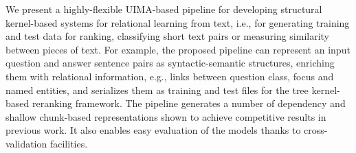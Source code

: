 We present a highly-flexible UIMA-based pipeline for developing structural kernel-based systems for relational learning from text, i.e., for generating training and test data for ranking, classifying short text pairs or measuring similarity between pieces of text. For example, the proposed pipeline can represent an input question and answer sentence pairs as syntactic-semantic structures, enriching them with relational information,  e.g., links between question class, focus and named entities, and serializes them as training and test files for the tree kernel-based reranking framework. The pipeline generates a number of dependency and shallow chunk-based representations shown to achieve competitive results in previous work. It also enables easy evaluation of the models thanks to cross-validation facilities.
